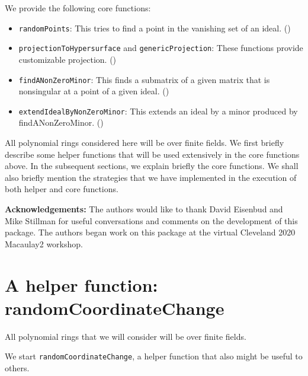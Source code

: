 \documentclass[11pt]{amsart}
\theoremstyle{definition}
\begin{document}
 We provide the following core functions:
 \begin{itemize}
	\item {\tt randomPoints}:  This tries to find a point in the vanishing set of an ideal. ()
 	\item {\tt projectionToHypersurface} and {\tt genericProjection}: These functions provide customizable projection. () 	
    \item {\tt findANonZeroMinor}:  This finds a submatrix of a given matrix that is nonsingular at a point of a given ideal. ()          
	\item {\tt extendIdealByNonZeroMinor}:  This extends an ideal by a minor produced by findANonZeroMinor. ()	
 \end{itemize}
 
All polynomial rings considered here will be over finite fields. We first briefly describe some helper functions that will be used extensively in the core functions above. In the subsequent sections, we explain briefly the core functions. We shall also briefly mention the strategies that we have implemented in the execution of both helper and core functions.

\vspace{1em}
\noindent \textbf{Acknowledgements:} The authors would like to thank David Eisenbud and Mike Stillman for useful conversations and comments on the development of this package.  The authors began work on this package at the virtual Cleveland 2020 Macaulay2 workshop.

\section{A helper function: randomCoordinateChange}{\label{helper}}

All polynomial rings that we will consider will be over finite fields.

We start {\tt randomCoordinateChange}, a helper function that also might be useful to others.

\end{document}
